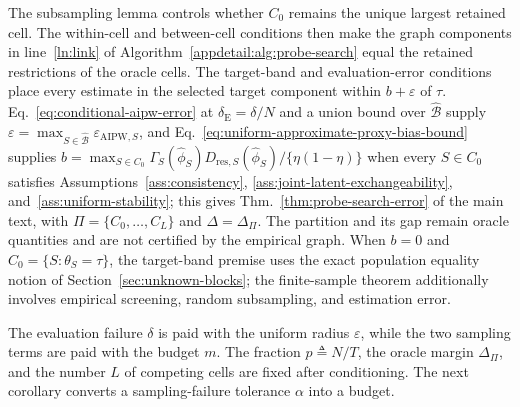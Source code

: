 The subsampling lemma controls whether $C_0$ remains the unique largest retained cell. The within-cell and between-cell conditions then make the graph components in line~\ref{ln:link} of Algorithm~\ref{appdetail:alg:probe-search} equal the retained restrictions of the oracle cells. The target-band and evaluation-error conditions place every estimate in the selected target component within $b+\varepsilon$ of $\tau$. Eq.~\eqref{eq:conditional-aipw-error} at $\delta_{\mathrm E}=\delta/N$ and a union bound over $\widehat{\mathcal B}$ supply $\varepsilon=\max_{S\in\widehat{\mathcal B}}\varepsilon_{\mathrm{AIPW},S}$, and Eq.~\eqref{eq:uniform-approximate-proxy-bias-bound} supplies $b=\max_{S\in C_0}\Gamma_S(\widehat\phi_S)D_{\mathrm{res},S}(\widehat\phi_S)/\{\eta(1-\eta)\}$ when every $S\in C_0$ satisfies Assumptions~\ref{ass:consistency}, \ref{ass:joint-latent-exchangeability}, and~\ref{ass:uniform-stability}; this gives Thm.~\ref{thm:probe-search-error} of the main text, with $\Pi=\{C_0,\ldots,C_L\}$ and $\Delta=\Delta_\Pi$. The partition and its gap remain oracle quantities and are not certified by the empirical graph. When $b=0$ and $C_0=\{S:\theta_S=\tau\}$, the target-band premise uses the exact population equality notion of Section~\ref{sec:unknown-blocks}; the finite-sample theorem additionally involves empirical screening, random subsampling, and estimation error.

The evaluation failure $\delta$ is paid with the uniform radius $\varepsilon$, while the two sampling terms are paid with the budget $m$. The fraction $p\triangleq N/T$, the oracle margin $\Delta_\Pi$, and the number $L$ of competing cells are fixed after conditioning. The next corollary converts a sampling-failure tolerance $\alpha$ into a budget.

